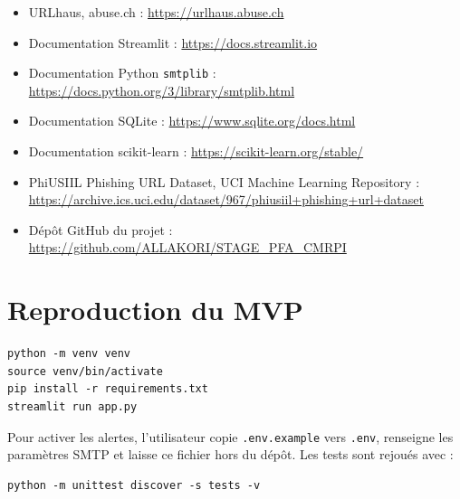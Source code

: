 \documentclass[11pt,a4paper]{report}
\begin{document}
\begin{itemize}
  \item URLhaus, abuse.ch : \url{https://urlhaus.abuse.ch}
  \item Documentation Streamlit : \url{https://docs.streamlit.io}
  \item Documentation Python \texttt{smtplib} :
        \url{https://docs.python.org/3/library/smtplib.html}
  \item Documentation SQLite : \url{https://www.sqlite.org/docs.html}
  \item Documentation scikit-learn : \url{https://scikit-learn.org/stable/}
  \item PhiUSIIL Phishing URL Dataset, UCI Machine Learning Repository :
        \url{https://archive.ics.uci.edu/dataset/967/phiusiil+phishing+url+dataset}
  \item Dépôt GitHub du projet :
        \url{https://github.com/ALLAKORI/STAGE_PFA_CMRPI}
\end{itemize}

\appendix
\chapter{Reproduction du MVP}

\begin{lstlisting}[language={},caption={Installation et lancement}]
python -m venv venv
source venv/bin/activate
pip install -r requirements.txt
streamlit run app.py
\end{lstlisting}

Pour activer les alertes, l'utilisateur copie \texttt{.env.example} vers
\texttt{.env}, renseigne les paramètres SMTP et laisse ce fichier hors du
dépôt. Les tests sont rejoués avec :

\begin{lstlisting}[language={},caption={Commande de validation}]
python -m unittest discover -s tests -v
\end{lstlisting}
\end{document}
